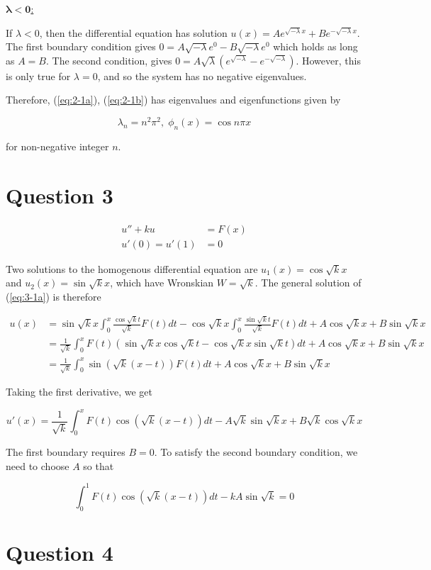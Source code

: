 \documentclass{article}
\begin{document}
\hfill\break
\underline{$\bm{\lambda < 0}$:}

If $\lambda < 0$, then the differential equation has solution
$u(x) = Ae^{\sqrt{-\lambda} x} + Be^{-\sqrt{-\lambda} x}$. The first boundary
condition gives $0 = A\sqrt{-\lambda}e^0 - B\sqrt{-\lambda}e^0$ which holds as
long as $A = B$. The second condition, gives
$0 = A\sqrt{\lambda}(e^{\sqrt{-\lambda}} - e^{-\sqrt{-\lambda}})$. However,
this is only true for $\lambda = 0$, and so the system has no negative
eigenvalues.

\hfill \break
Therefore, (\ref{eq:2-1a}), (\ref{eq:2-1b}) has eigenvalues and eigenfunctions
given by

\begin{equation*}
    \lambda_n = n^2\pi^2,\; \phi_n(x) = \cos n\pi x
\end{equation*}

for non-negative integer $n$.

\section*{Question 3}

\begin{align}
    u'' + ku &= F(x) \label{eq:3-1a}\\
    u'(0) = u'(1) &= 0 \label{eq:3-1b}
\end{align}

Two solutions to the homogenous differential equation are
$u_1(x) = \cos\sqrt k x$ and $u_2(x) = \sin\sqrt k x$, which have Wronskian
$W = \sqrt k$. The general solution of (\ref{eq:3-1a}) is therefore

\begin{align}
    u(x) &= \sin\sqrt k x \int_0^x \frac{\cos\sqrt k t}{\sqrt k} F(t) dt
        -\cos\sqrt k x \int_0^x \frac{\sin\sqrt k t}{\sqrt k} F(t)dt
        + A\cos\sqrt k x + B\sin\sqrt k x \nonumber\\
    &= \frac{1}{\sqrt k}\int_0^x F(t)(\sin\sqrt k x\cos\sqrt k t
        - \cos\sqrt k x \sin\sqrt k t) dt + A\cos\sqrt k x
        + B\sin\sqrt k x \nonumber\\
    &= \frac{1}{\sqrt{k}} \int_0^x \sin(\sqrt k(x - t))F(t) dt
        + A\cos\sqrt k x + B\sin\sqrt k x \label{eq:3-2}
\end{align}

Taking the first derivative, we get

\begin{equation} \label{eq:3-3}
    u'(x) = \frac{1}{\sqrt k}\int_0^x F(t)\cos(\sqrt k(x - t)) dt
        - A\sqrt k\sin\sqrt k x + B\sqrt k\cos\sqrt k x
\end{equation}

The first boundary requires $B = 0$. To satisfy the second boundary
condition, we need to choose $A$ so that

\begin{equation} \label{eq:3-4}
    \int_0^1 F(t)\cos(\sqrt k(x - t)) dt -kA\sin\sqrt k = 0
\end{equation}

\section*{Question 4}
\end{document}
